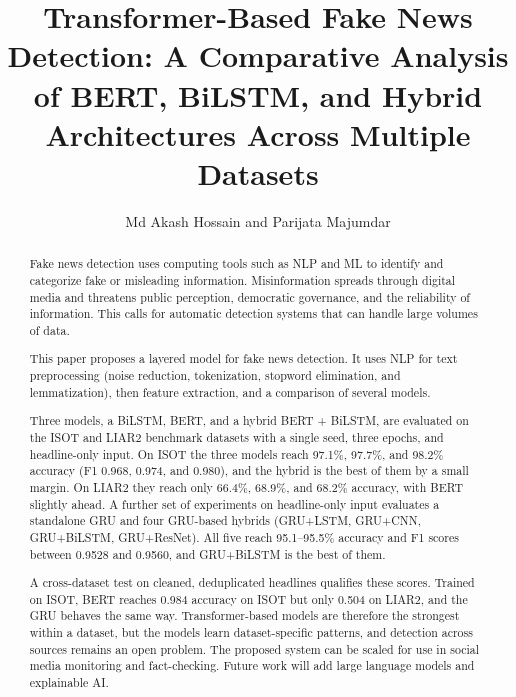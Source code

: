 \documentclass[runningheads]{llncs}
\begin{document}
\title{Transformer-Based Fake News Detection: A Comparative Analysis of BERT, BiLSTM, and Hybrid Architectures Across Multiple Datasets}


\author{Md Akash Hossain and Parijata Majumdar }

\maketitle              %

\begin{abstract}
Fake news detection uses computing tools such as NLP and ML to identify and categorize fake or misleading information. Misinformation spreads through digital media and threatens public perception, democratic governance, and the reliability of information. This calls for automatic detection systems that can handle large volumes of data.

This paper proposes a layered model for fake news detection. It uses NLP for text preprocessing (noise reduction, tokenization, stopword elimination, and lemmatization), then feature extraction, and a comparison of several models.

Three models, a BiLSTM, BERT, and a hybrid BERT + BiLSTM, are evaluated on the ISOT and LIAR2 benchmark datasets with a single seed, three epochs, and headline-only input. On ISOT the three models reach 97.1\%, 97.7\%, and 98.2\% accuracy (F1 0.968, 0.974, and 0.980), and the hybrid is the best of them by a small margin. On LIAR2 they reach only 66.4\%, 68.9\%, and 68.2\% accuracy, with BERT slightly ahead. A further set of experiments on headline-only input evaluates a standalone GRU and four GRU-based hybrids (GRU+LSTM, GRU+CNN, GRU+BiLSTM, GRU+ResNet). All five reach 95.1--95.5\% accuracy and F1 scores between 0.9528 and 0.9560, and GRU+BiLSTM is the best of them.

A cross-dataset test on cleaned, deduplicated headlines qualifies these scores. Trained on ISOT, BERT reaches 0.984 accuracy on ISOT but only 0.504 on LIAR2, and the GRU behaves the same way. Transformer-based models are therefore the strongest within a dataset, but the models learn dataset-specific patterns, and detection across sources remains an open problem. The proposed system can be scaled for use in social media monitoring and fact-checking. Future work will add large language models and explainable AI.

\end{abstract}
\end{document}
